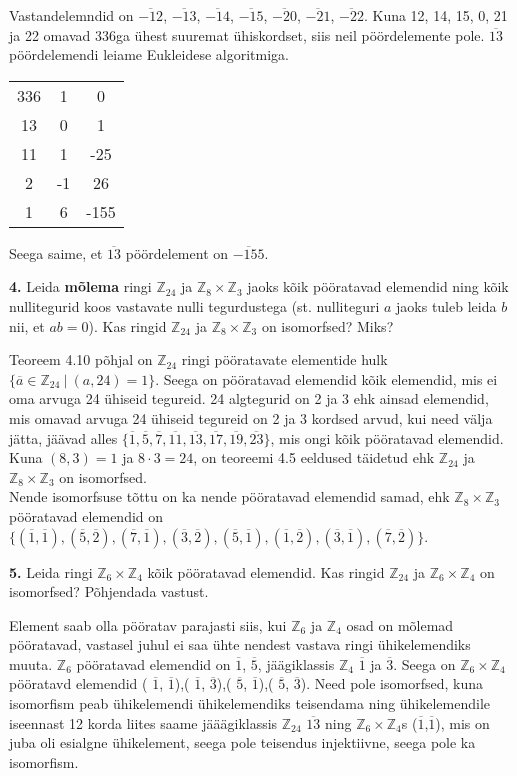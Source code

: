 \documentclass[a4paper, 10pt]{article}
\newcommand{\Z}{\mathbb{Z}}
\newcommand{\w}{\overline}
\begin{document}
\bigskip
Vastandelemndid on $\overline{-12}$, $\overline{-13}$, $\overline{-14}$, $\overline{-15}$, $\overline{-20}$, $\overline{-21}$, $\overline{-22}$. Kuna  12, 14, 15, 0, 21 ja 22 omavad 336ga ühest suuremat ühiskordset, siis neil pöördelemente pole. $\overline{13}$ pöördelemendi leiame Eukleidese algoritmiga.
\begin{center}
\begin{tabular}{ c c c}
336&1&0\\
13&0&1\\
11&1&-25\\
2&-1&26\\
1&6&-155
\end{tabular}
\end{center}
Seega saime, et $\overline{13}$ pöördelement on $\overline{-155}$.
\bigskip

\noindent \textbf{4.} Leida {\bf mõlema} ringi $\Z_{24}$ ja $\Z_{8}\times\Z_{3}$ jaoks k\~oik p\"o\"oratavad elemendid ning k\~oik nulli\-tegurid koos vastavate nulli tegurdustega (st. nulliteguri $a$ jaoks tuleb leida $b$ nii, et $ab=0$). Kas ringid $\Z_{24}$ ja $\Z_8\times\Z_{3}$ on isomorfsed? Miks?

\bigskip
Teoreem 4.10 põhjal on $\Z_{24}$ ringi pööratavate elementide hulk $\{\overline{a}\in\Z_{24}\ |\ (a,24)=1\}$. Seega on pööratavad elemendid kõik elemendid, mis ei oma arvuga 24 ühiseid tegureid. 24 algtegurid on 2 ja 3 ehk ainsad elemendid, mis omavad arvuga 24 ühiseid tegureid on 2 ja 3 kordsed arvud, kui need välja jätta, jäävad alles $\{\w1,\w5,\w7,\w{11},\w{13},\w{17},\w{19},\w{23}\}$, mis ongi kõik pööratavad elemendid.\\
Kuna $(8,3)=1$ ja $8\cdot3=24$, on teoreemi 4.5 eeldused täidetud ehk $\Z_{24}$ ja $\Z_8\times\Z_3$ on isomorfsed.\\
Nende isomorfsuse tõttu on ka nende pööratavad elemendid samad, ehk $\Z_8\times\Z_3$ pööratavad elemendid on $\{(\w1,\w1),(\w5,\w2),(\w7,\w1),(\w{3},\w2),(\w{5},\w1),(\w{1},\w2),(\w{3},\w1),(\w{7},\w2)\}$.
\bigskip

\pagebreak

\noindent \textbf{5.} Leida ringi $\Z_{6}\times\Z_{4}$ k\~oik p\"o\"oratavad elemendid. Kas ringid $\Z_{24}$ ja $\Z_{6}\times\Z_{4}$ on isomorfsed? Põhjendada vastust.

\bigskip
Element saab olla pööratav parajasti siis, kui $\Z_6$ ja $\Z_4$ osad on mõlemad pööratavad, vastasel juhul ei saa ühte nendest vastava ringi ühikelemendiks muuta. $\Z_6$ pööratavad elemendid on $\overline{1}$, $\overline{5}$, jäägiklassis $\Z_4$  $\overline{1}$ ja $\overline{3}$. Seega on $\Z_6\times\Z_4$ pööratavd elemendid ( $\overline{1}$, $\overline{1}$),( $\overline{1}$, $\overline{3}$),( $\overline{5}$, $\overline{1}$),( $\overline{5}$, $\overline{3}$). Need pole isomorfsed, kuna isomorfism peab ühikelemendi ühikelemendiks teisendama ning ühikelemendile iseennast 12 korda liites saame jääägiklassis $\Z_{24}$ $\overline{13}$ ning $\Z_6\times\Z_4$s ($\overline{1}$,$\overline{1}$), mis on juba oli esialgne ühikelement, seega pole teisendus injektiivne, seega pole ka isomorfism.
\bigskip
\end{document}
